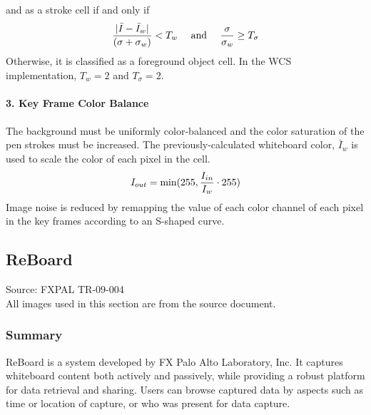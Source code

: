 \documentclass{article}
\begin{document}
and as a stroke cell if and only if
\[{|\bar{I}-\bar{I}_w| \over (\sigma + \sigma_w)}<T_w \quad \textrm{ and } \quad {\sigma \over \sigma_w} \geq T_\sigma \] 
Otherwise, it is classified as a foreground object cell.  In the WCS implementation, $T_w=2$ and $T_\sigma=2$. \\ \\
	\textbf{3. Key Frame Color Balance} \\ \\ 
The background must be uniformly color-balanced and the color saturation of the pen strokes must be increased.  The previously-calculated whiteboard color, $\bar{I}_w$ is used to scale the color of each pixel in the cell. \[ I_{out} = \textrm{min} (255, {I_{in} \over I_w} \cdot 255) \]
Image noise is reduced by remapping the value of each color channel of each pixel in the key frames according to an S-shaped curve.
	
	\subsection*{ReBoard}
Source: FXPAL TR-09-004 \cite{reboard} \\
All images used in this section are from the source document. 
	\subsubsection*{Summary}
ReBoard is a system developed by FX Palo Alto Laboratory, Inc.  It captures whiteboard content both actively and passively, while providing a robust platform for data retrieval and sharing.  Users can browse captured data by aspects such as time or location of capture, or who was present for data capture.  
\end{document}
